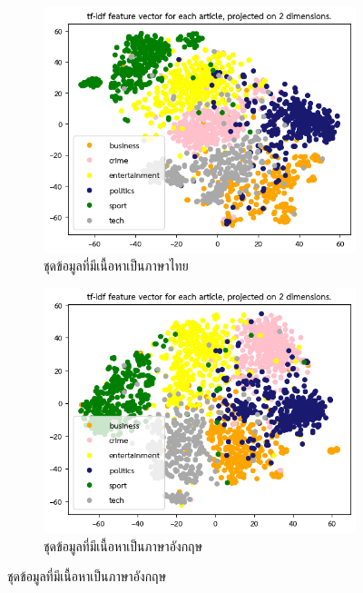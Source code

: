 \documentclass[12pt,oneside,openright,a4paper]{cpe-thai-project}
\begin{document}
\begin{itemize}
      \begin{figure}[!ht]\centering
        \begin{subfigure}{0.49\textwidth}
          \includegraphics[width=\linewidth]{./img/thai_stat/tfidf.png} 
          \caption{ชุดข้อมูลที่มีเนื้อหาเป็นภาษาไทย}
          \label{fig:tsne_thai}
        \end{subfigure}
        \begin{subfigure}{0.49\textwidth}
          \includegraphics[width=\linewidth]{./img/eng_stat/tfidf.png}
          \caption{ชุดข้อมูลที่มีเนื้อหาเป็นภาษาอังกฤษ}
          \label{fig:tsne_eng}
        \end{subfigure}

\end{figure}
\end{itemize}
\end{document}
